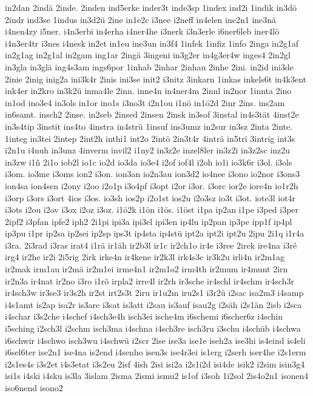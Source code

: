 {in2dan
2indä
2inde.
2inden
ind5erke
inder3t
inde3sp
1index
ind2i
1indik
in3dö
2indr
ind3se
1indus
in3d2ü
2ine
in1e2c
i3nee
i2neff
in4elen
ine2n1
ine3nä
i4nen4zy
i5ner.
i4n3erbi
in4erha
i4ner4he
i3nerk
i3n3erle
i6ner6leb
iner4lö
i4n3er4tr
i3nes
i4nesk
in2et
in1eu
ine3un
in3f4
1infek
1infiz
1info
2inga
in2g1af
in2g1ag
in2g1al
in2gam
ing1ar
2ingä
3ingeni
in3g2er
in4g3er4w
inges4
2in2gl
in3gla
in3glä
ing4s3am
ings6por
1inhab
2inhar
2inhau
2inhe
2ini.
in2id
ini3de
2inie
2inig
inig2a
ini3k4r
2inis
ini3se
init2
i3nitz
3inkarn
1inkas
inkels6t
in4k3ent
ink4er
in2kro
in3k2ü
inma4le
2inn.
inne4n
in4ner4m
2innl
in2nor
1innta
2ino
in1od
ino3e4
in3ols
in1or
ino1s
i3no3t
i2n1ou
i1nö
in1ö2d
2inr
2ins.
ins2am
in6samt.
insch2
2inse.
in2seb
2insed
2insen
2insk
in3sof
3instal
in4s3tät
4inst2e
in3s4tip
3instit
ins4to
4instra
in4strü
1insuf
ins3umz
in2sur
in3sz
2inta
2inte.
1integ
in3tei
2intep
2int2h
inthi1
int2o
2intö
2in3t4r
4inträ
in5tri
3intrig
int3s
i2n1u
i4nuh
in3unz
4inverm
invil2
i1ny2
in3z2e
inzel8ler
in3z2i
in3z2sc
inz2u
in3zw
i1ñ
2i1o
iob2l
io1c
io2d
io3da
io3e4
i2of
iof4l
i2oh
io1i
io3k6r
i3ol.
i3ols
i3om.
io3me
i3oms
ion2
i3on.
ion3an
io2n3au
ion3d2
io4nee
i3ono
io2nor
i3ons3
ion4sa
ion4sen
i2ony
i2oo
i2o1p
i3o4pf
i3opt
i2or
i3or.
i3orc
ior2e
iore4n
io1r2h
i3orp
i3ors
i3ort
4ios
i3os.
io3sh
ios2p
i2o1st
ios2u
i2o3sz
io3t
i3ot.
iote3l
iot4r
i3ots
i2ou
i2ov
i3ox
i2oz
i3oz.
i1ö2k
i1ön
i1ös.
i1öst
i1pa
ip2an
i1pe
i3ped
i3per
2ipf2
i3pfan
ipfe2
iph2
2i1pi
ipi3a
ipi3el
ipi3en
ip4lu
ip2pan
ip3pe
ipp1f
ip4pl
ip3pu
i1pr
ip2sa
ip2sei
ip2sp
ips3t
ip4sta
ip4stü
ipt2a
ipt2i
ipt2u
2ipu
2i1q
i1r4a
i3ra.
2i3rad
i3ras
irat4
i1rä
ir1äh
ir2b3l
ir1c
ir2ch1o
ir4e
i3ree
2irek
ire4na
i3ré
irg4
ir2he
ir2i
2i5rig
2irk
irke4n
ir4kene
ir2k3l
irk4s3c
ir3k2u
irli4n
ir2m1ag
ir2mak
irm1au
ir2mä
ir2m1ei
irme4n1
ir2m1o2
irm4th
ir2mum
ir4munt
2irn
ir2n3a
ir4nat
ir2no
i3ro
i1rö
irpla2
irre4l
ir2rh
ir3sche
ir4schl
ir4schm
ir4sch3r
ir4sch3w
ir3se3
ir3s2h
ir2st
irt2s3t
2iru
ir1u2m
iru2s1
i3r2ü
i2sac
isa2m3
i4samp
i4s1amt
is2ap
isa2r
is3are
i3sat
is3att
i2sau
is3auf
isau2g
i2säh
i2s1än
2isb
i2sca
i4schar
i3s2che
i4schef
i4sch3e4h
isch3ei
ische4m
i6schemi
i6scher6z
i4schin
i5sching
i2sch3l
i2schm
isch3ma
i4schna
i4sch3re
isch3ru
i3schu
i4schüb
i4schwa
i6schwir
i4schwo
isch3wu
i4schwü
i2scr
2ise
ise3a
ise1e
iseh2a
ise3hi
is4eind
is4eli
i6sel6ter
ise2n1
ise4na
is2end
i4senho
isen3s
ise4r3ei
is1erg
i2serh
iser4he
i2s1erm
i2s1es4s
i3s2et
i4s3etat
i3s2eu
2isf
4ish
2isi
isi2a
i2s1i2d
isi4de
isik2
i2sim
isin3g4
isi1s
i4ski
i4sku
is3la
3islam
2isma
2ismi
ismu2
is1of
i3soh
1i2sol
2is4o2n1
isonen4
iso6nend
isono2
}
